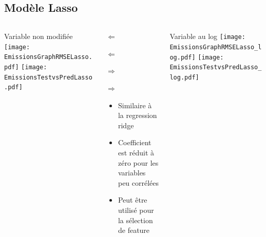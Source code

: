 \documentclass[8pt,aspectratio=169,hyperref={unicode=true}]{beamer}
\begin{document}
\subsection{Modèle Lasso}
\begin{frame}{\insertsubsection}
  \begin{columns}[t]
    \begin{column}{.33\textwidth}
      \centering Variable non modifiée
      \texttt{[image: EmissionsGraphRMSELasso.pdf]}
      \texttt{[image: EmissionsTestvsPredLasso.pdf]}
    \end{column}
    \begin{column}{.33\textwidth}
      $\Longleftarrow$
      \scriptsize
      {\centering
        }
      

      \normalsize
      $\Longleftarrow$

      \raggedleft $\Longrightarrow$
      \scriptsize
      {\centering
        }
      

      \normalsize
      $\Longrightarrow$

      \raggedright
      \begin{itemize}
        \item Similaire à la regression ridge
        \item Coefficient est réduit à zéro pour les variables peu corrélées
        \item Peut être utilisé pour la sélection de feature
      \end{itemize}
    \end{column}
    \begin{column}{.33\textwidth}
      \centering Variable au log
      \texttt{[image: EmissionsGraphRMSELasso\_log.pdf]}
      \texttt{[image: EmissionsTestvsPredLasso\_log.pdf]}
    \end{column}
  \end{columns}
\end{frame}
\end{document}
